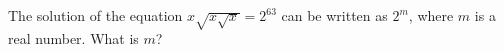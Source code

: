 The solution of the equation $x\sqrt{x\sqrt x}=2^{63}$ can be written as $2^m$, where $m$ is a real number. What is $m$?
